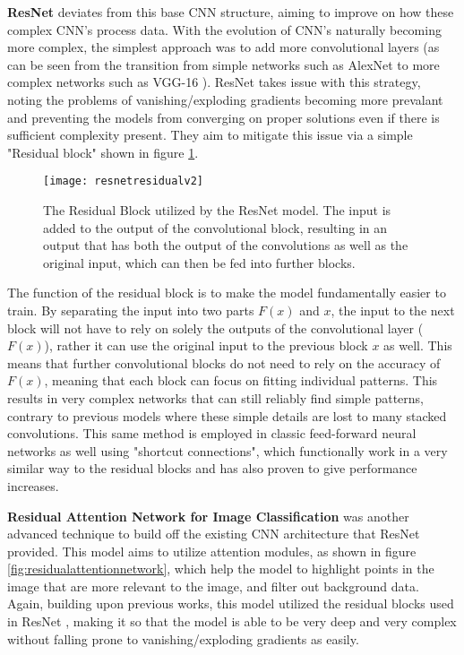\textbf{ResNet} \cite{resnet} deviates from this base CNN structure, aiming to improve on how these complex CNN's process data. With the evolution of CNN's naturally becoming more complex, the simplest approach was to add more convolutional layers (as can be seen from the transition from simple networks such as AlexNet \cite{alexnet} to more complex networks such as VGG-16 \cite{vgg16}). ResNet takes issue with this strategy, noting the problems of vanishing/exploding gradients becoming more prevalant and preventing the models from converging on proper solutions even if there is sufficient complexity present. They aim to mitigate this issue via a simple "Residual block" shown in figure \ref{fig:resnetresidual}.

\begin{figure}[ht]
	\texttt{[image: resnetresidualv2]}
	\centering
	\caption{The Residual Block utilized by the ResNet \cite{resnet} model. The input is added to the output of the convolutional block, resulting in an output that has both the output of the convolutions as well as the original input, which can then be fed into further blocks.}
	\label{fig:resnetresidual}
\end{figure}

The function of the residual block is to make the model fundamentally easier to train. By separating the input into two parts $F(x)$ and $x$, the input to the next block will not have to rely on solely the outputs of the convolutional layer ($F(x)$), rather it can use the original input to the previous block $x$ as well. This means that further convolutional blocks do not need to rely on the accuracy of $F(x)$, meaning that each block can focus on fitting individual patterns. This results in very complex networks that can still reliably find simple patterns, contrary to previous models where these simple details are lost to many stacked convolutions. This same method is employed in classic feed-forward neural networks as well using "shortcut connections", which functionally work in a very similar way to the residual blocks and has also proven to give performance increases.

\textbf{Residual Attention Network for Image Classification} \cite{residualattentionnetwork} was another advanced technique to build off the existing CNN architecture that ResNet provided. This model aims to utilize attention modules, as shown in figure \ref{fig:residualattentionnetwork}, which help the model to highlight points in the image that are more relevant to the image, and filter out background data. Again, building upon previous works, this model utilized the residual blocks used in ResNet \cite{resnet}, making it so that the model is able to be very deep and very complex without falling prone to vanishing/exploding gradients as easily.

